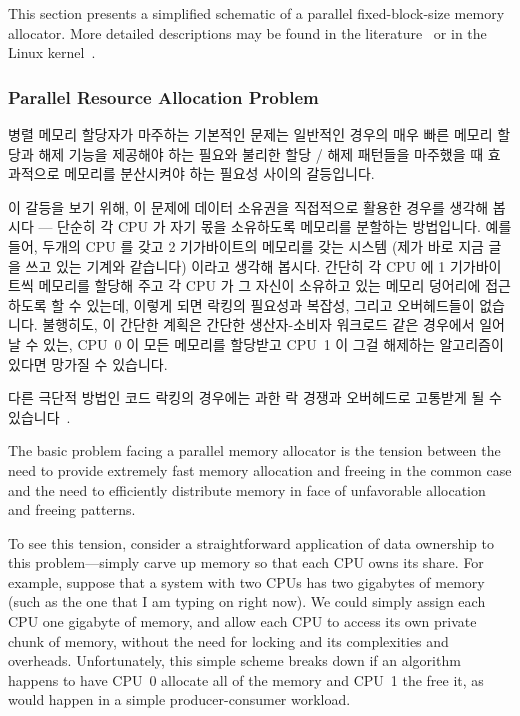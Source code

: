 This section presents a simplified schematic of a parallel fixed-block-size
memory allocator.
More detailed descriptions may be found in the
literature~\cite{McKenney92a,McKenney93,Bonwick01slab,McKenney01e}
or in the Linux kernel~\cite{Torvalds2.6kernel}.
\fi

\subsubsection{Parallel Resource Allocation Problem}

병렬 메모리 할당자가 마주하는 기본적인 문제는 일반적인 경우의 매우 빠른 메모리
할당과 해제 기능을 제공해야 하는 필요와 불리한 할당 / 해제 패턴들을 마주했을 때
효과적으로 메모리를 분산시켜야 하는 필요성 사이의 갈등입니다.

이 갈등을 보기 위해, 이 문제에 데이터 소유권을 직접적으로 활용한 경우를 생각해
봅시다 --- 단순히 각 CPU 가 자기 몫을 소유하도록 메모리를 분할하는 방법입니다.
예를 들어, 두개의 CPU 를 갖고 2 기가바이트의 메모리를 갖는 시스템 (제가 바로
지금 글을 쓰고 있는 기계와 같습니다) 이라고 생각해 봅시다.
간단히 각 CPU 에 1 기가바이트씩 메모리를 할당해 주고 각 CPU 가 그 자신이
소유하고 있는 메모리 덩어리에 접근하도록 할 수 있는데, 이렇게 되면 락킹의
필요성과 복잡성, 그리고 오버헤드들이 없습니다.
불행히도, 이 간단한 계획은 간단한 생산자-소비자 워크로드 같은 경우에서 일어날
수 있는, CPU~0 이 모든 메모리를 할당받고 CPU~1 이 그걸 해제하는 알고리즘이
있다면 망가질 수 있습니다.

다른 극단적 방법인 코드 락킹의 경우에는 과한 락 경쟁과 오버헤드로 고통받게 될
수 있습니다~\cite{McKenney93}.
\iffalse

The basic problem facing a parallel memory allocator is the tension
between the need to provide extremely fast memory allocation and
freeing in the common case and the need to efficiently distribute
memory in face of unfavorable allocation and freeing patterns.

To see this tension, consider a straightforward application of
data ownership to this problem---simply carve up memory so that
each CPU owns its share.
For example, suppose that a system with two CPUs has two gigabytes
of memory (such as the one that I am typing on right now).
We could simply assign each CPU one gigabyte of memory, and allow
each CPU to access its own private chunk of memory, without the
need for locking and its complexities and overheads.
Unfortunately, this simple scheme breaks down if an algorithm happens
to have CPU~0 allocate all of the memory and CPU~1 the free it, as
would happen in a simple producer-consumer workload.

